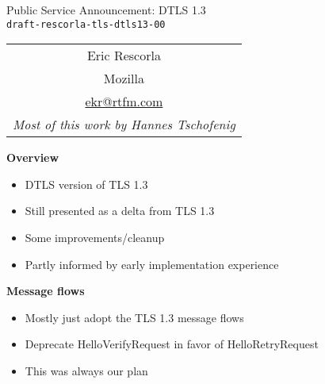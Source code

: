 \documentclass[helvetica]{seminar}
\newcommand{\heading}[1]{%
  \begin{center} 
    \large\bf 
    #1 
  \end{center} 
  \vspace{.4 in}}
\begin{document}
\begin{slide}
\begin{center}
\vspace{.5 in}
\LARGE{{\bf}Public Service Announcement: DTLS 1.3\\{\small \verb^draft-rescorla-tls-dtls13-00^}}\\
\vspace{.2in}
\large{
\begin{tabular}{c}
Eric Rescorla\\
Mozilla\\
\url{ekr@rtfm.com}
\\
\emph{Most of this work by Hannes Tschofenig}
\end{tabular}
}
\end{center}
\end{slide}

\centerslidesfalse 

\begin{slide}
\heading{Overview}

\begin{itemize}
\item DTLS version of TLS 1.3
\item Still presented as a delta from TLS 1.3
\item Some improvements/cleanup
\item Partly informed by early implementation experience
\end{itemize}

\end{slide}

\begin{slide}
\heading{Message flows}

\begin{itemize}
\item Mostly just adopt the TLS 1.3 message flows
\item Deprecate HelloVerifyRequest in favor of HelloRetryRequest
\item This was always our plan
\end{itemize}
\end{slide}
\end{document}
